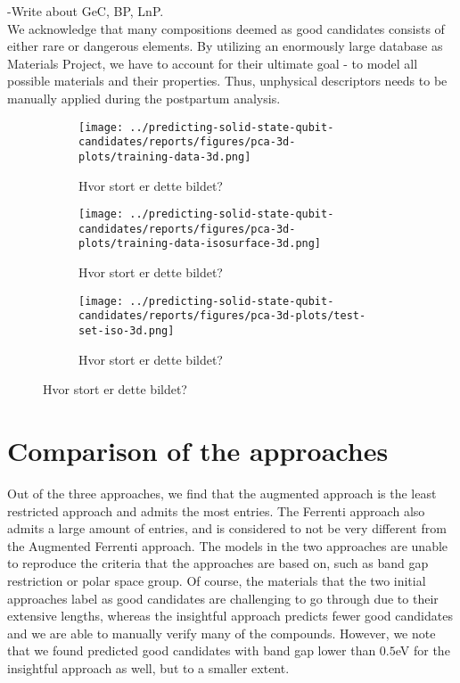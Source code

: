 -Write about GeC, BP, LnP.
\\

We acknowledge that many compositions deemed as good candidates consists of either rare or dangerous elements. By utilizing an enormously large database as Materials Project, we have to account for their ultimate goal - to model all possible materials and their properties. Thus, unphysical descriptors needs to be manually applied during the postpartum analysis.

\begin{figure}[ht!]
  \begin{subfigure}{0.5\textwidth}
    \centering
    \texttt{[image: ../predicting-solid-state-qubit-candidates/reports/figures/pca-3d-plots/training-data-3d.png]}
    \caption{Hvor stort er dette bildet?}
    \label{fig:3d-1}
  \end{subfigure}
  \begin{subfigure}{0.5\textwidth}
    \centering
    \texttt{[image: ../predicting-solid-state-qubit-candidates/reports/figures/pca-3d-plots/training-data-isosurface-3d.png]}
    \caption{Hvor stort er dette bildet?}
    \label{fig:3d-2}
  \end{subfigure}
  \begin{subfigure}{0.5\textwidth}
    \centering
    \texttt{[image: ../predicting-solid-state-qubit-candidates/reports/figures/pca-3d-plots/test-set-iso-3d.png]}
    \caption{Hvor stort er dette bildet?}
    \label{fig:3d-3}
  \end{subfigure}
\end{figure}


\section{Comparison of the approaches}

Out of the three approaches, we find that the augmented approach is the least restricted approach and admits the most entries. The Ferrenti approach also admits a large amount of entries, and is considered to not be very different from the Augmented Ferrenti approach. The models in the two approaches are unable to reproduce the criteria that the approaches are based on, such as band gap restriction or polar space group. Of course, the materials that the two initial approaches label as good candidates are challenging to go through due to their extensive lengths, whereas the insightful approach predicts fewer good candidates and we are able to manually verify many of the compounds. However, we note that we found predicted good candidates with band gap lower than $0.5$eV for the insightful approach as well, but to a smaller extent.

